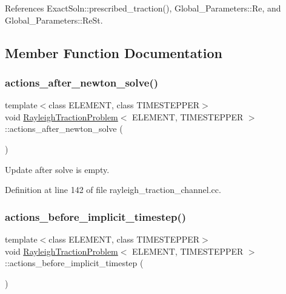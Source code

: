 References Exact\+Soln\+::prescribed\+\_\+traction(), Global\+\_\+\+Parameters\+::\+Re, and Global\+\_\+\+Parameters\+::\+Re\+St.



\subsection{Member Function Documentation}
\mbox{\label{classRayleighTractionProblem_ad85c20559eec76d54ebf666f62507d2e}} 
\subsubsection{\texorpdfstring{actions\+\_\+after\+\_\+newton\+\_\+solve()}{actions\_after\_newton\_solve()}}
{\footnotesize\ttfamily template$<$class E\+L\+E\+M\+E\+NT, class T\+I\+M\+E\+S\+T\+E\+P\+P\+ER$>$ \\
void \hyperlink{classRayleighTractionProblem}{Rayleigh\+Traction\+Problem}$<$ E\+L\+E\+M\+E\+NT, T\+I\+M\+E\+S\+T\+E\+P\+P\+ER $>$\+::actions\+\_\+after\+\_\+newton\+\_\+solve (\begin{DoxyParamCaption}{ }\end{DoxyParamCaption})\hspace{0.3cm}{\ttfamily [inline]}}



Update after solve is empty. 



Definition at line 142 of file rayleigh\+\_\+traction\+\_\+channel.\+cc.

\mbox{\label{classRayleighTractionProblem_aea3e470265c0e98a8b5bdabedd28eb82}} 
\subsubsection{\texorpdfstring{actions\+\_\+before\+\_\+implicit\+\_\+timestep()}{actions\_before\_implicit\_timestep()}}
{\footnotesize\ttfamily template$<$class E\+L\+E\+M\+E\+NT, class T\+I\+M\+E\+S\+T\+E\+P\+P\+ER$>$ \\
void \hyperlink{classRayleighTractionProblem}{Rayleigh\+Traction\+Problem}$<$ E\+L\+E\+M\+E\+NT, T\+I\+M\+E\+S\+T\+E\+P\+P\+ER $>$\+::actions\+\_\+before\+\_\+implicit\+\_\+timestep (\begin{DoxyParamCaption}{ }\end{DoxyParamCaption})\hspace{0.3cm}{\ttfamily [inline]}}



